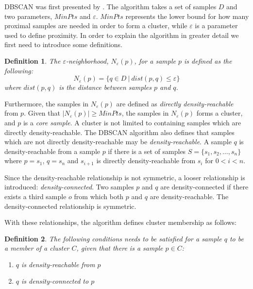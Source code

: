 \documentclass[a4paper]{report}
\newtheorem*{definition}{Definition}
\begin{document}
DBSCAN was first presented by \citet{ester96}. The algorithm takes a set of
samples $D$ and two parameters, $MinPts$ and $\varepsilon$. $MinPts$ represents
the lower bound for how many proximal samples are needed in order to form a
cluster, while $\varepsilon$ is a parameter used to define proximity. In order
to explain the algorithm in greater detail we first need to introduce some
definitions.

\begin{definition}
The \emph{$\varepsilon$-neighborhood}, $N_{\varepsilon}(p)$, for a sample $p$
is defined as the following:
\[
    N_{\varepsilon}(p) = \{ q \in D ~|~ dist(p,q) \le \varepsilon  \}
    \label{eq:eps}
\]
where $dist(p,q)$ is the distance between samples $p$ and $q$.
\end{definition}

Furthermore, the samples in $N_{\varepsilon}(p)$ are defined as \emph{directly
density-reachable} from $p$. Given that $|N_{\varepsilon}(p)| \ge MinPts$, the
samples in $N_{\varepsilon}(p)$ forms a cluster, and $p$ is a \emph{core
sample}. A cluster is not limited to containing samples which are directly
density-reachable. The DBSCAN algorithm also defines that samples which are not
directly density-reachable may be \emph{density-reachable}. A sample $q$ is
density-reachable from a sample $p$ if there is a set of samples
$S = \{s_1, s_2, \ldots, s_n\}$ where $p = s_1$, $q = s_n$ and $s_{i+1}$ is
directly density-reachable from $s_i$ for $0 < i < n$.

Since the density-reachable relationship is not symmetric, a looser
relationship is introduced: \emph{density-connected}. Two samples $p$ and
$q$ are density-connected if there exists a third sample $o$ from which both
$p$ and $q$ are density-reachable. The density-connected relationship
is symmetric.

With these relationships, the algorithm defines cluster membership as
follows:

\begin{definition}
    The following conditions needs to be satisfied for a sample $q$ to be a
    member of a cluster $C$, given that there is a sample $p \in C$:
    \begin{enumerate}
        \item $q$ is density-reachable from $p$
        \item $q$ is density-connected to $p$
    \end{enumerate}
\end{definition}
\end{document}
